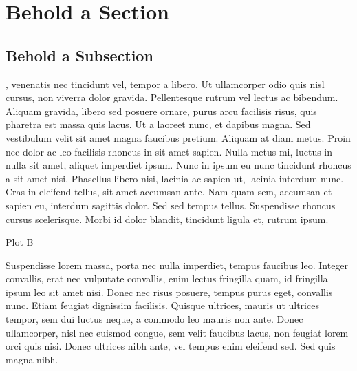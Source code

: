 \documentclass{tufte-handout}
\begin{document}
\section{Behold a Section}

\subsection{Behold a Subsection}
, venenatis nec tincidunt vel, tempor a libero. Ut ullamcorper odio quis nisl cursus, non viverra dolor gravida. Pellentesque rutrum vel lectus ac bibendum. Aliquam gravida, libero sed posuere ornare, purus arcu facilisis risus, quis pharetra est massa quis lacus. Ut a laoreet nunc, et dapibus magna. Sed vestibulum velit sit amet magna faucibus pretium. Aliquam at diam metus. Proin nec dolor ac leo facilisis rhoncus in sit amet sapien. Nulla metus mi, luctus in nulla sit amet, aliquet imperdiet ipsum. Nunc in ipsum eu nunc tincidunt rhoncus a sit amet nisi. Phasellus libero nisi, lacinia ac sapien ut, lacinia interdum nunc. Cras in eleifend tellus, sit amet accumsan ante. Nam quam sem, accumsan et sapien eu, interdum sagittis dolor. Sed sed tempus tellus. Suspendisse rhoncus cursus scelerisque. Morbi id dolor blandit, tincidunt ligula et, rutrum ipsum.

\pgfplotsset{width=5cm,compat=1.9}
\begin{marginfigure}
\caption{Plot B}
\end{marginfigure}

Suspendisse lorem massa, porta nec nulla imperdiet, tempus faucibus leo. Integer convallis, erat nec vulputate convallis, enim lectus fringilla quam, id fringilla ipsum leo sit amet nisi. Donec nec risus posuere, tempus purus eget, convallis nunc. Etiam feugiat dignissim facilisis. Quisque ultrices, mauris ut ultrices tempor, sem dui luctus neque, a commodo leo mauris non ante. Donec ullamcorper, nisl nec euismod congue, sem velit faucibus lacus, non feugiat lorem orci quis nisi. Donec ultrices nibh ante, vel tempus enim eleifend sed. Sed quis magna nibh.
\end{document}
